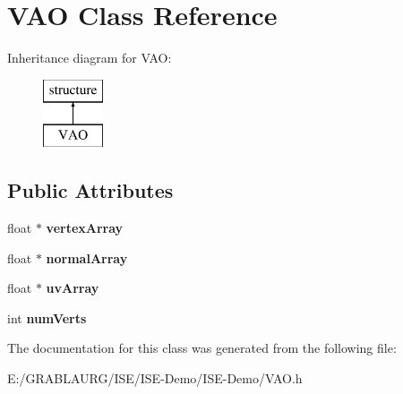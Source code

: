 \hypertarget{class_v_a_o}{\section{V\-A\-O Class Reference}
\label{class_v_a_o}
}
Inheritance diagram for V\-A\-O\-:\begin{figure}[H]
\begin{center}
\leavevmode
\includegraphics[height=2.000000cm]{class_v_a_o}
\end{center}
\end{figure}
\subsection*{Public Attributes}
\begin{DoxyCompactItemize}
\item 
\hypertarget{class_v_a_o_a4bb703efebc8b659fafb9214df1c00a2}{float $\ast$ {\bfseries vertex\-Array}}\label{class_v_a_o_a4bb703efebc8b659fafb9214df1c00a2}

\item 
\hypertarget{class_v_a_o_a8cac351866d092035d0dd3e1db550443}{float $\ast$ {\bfseries normal\-Array}}\label{class_v_a_o_a8cac351866d092035d0dd3e1db550443}

\item 
\hypertarget{class_v_a_o_a151242cdc48c1f31b1db972e0ed623b3}{float $\ast$ {\bfseries uv\-Array}}\label{class_v_a_o_a151242cdc48c1f31b1db972e0ed623b3}

\item 
\hypertarget{class_v_a_o_a25d570ad1a339b9928f34f920cbae339}{int {\bfseries num\-Verts}}\label{class_v_a_o_a25d570ad1a339b9928f34f920cbae339}

\end{DoxyCompactItemize}


The documentation for this class was generated from the following file\-:\begin{DoxyCompactItemize}
\item 
E\-:/\-G\-R\-A\-B\-L\-A\-U\-R\-G/\-I\-S\-E/\-I\-S\-E-\/\-Demo/\-I\-S\-E-\/\-Demo/V\-A\-O.\-h\end{DoxyCompactItemize}
